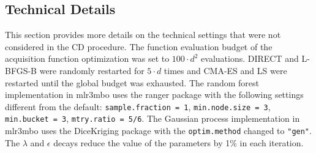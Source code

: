 \subsection*{Technical Details}
\label{sec:technical-details}

This section provides more details on the technical settings that were not considered in the CD procedure.
The function evaluation budget of the acquisition function optimization was set to $100 \cdot d^2$ evaluations.
DIRECT and L-BFGS-B were randomly restarted for $5 \cdot d$ times and CMA-ES and LS were restarted until the global budget was exhausted.
The random forest implementation in mlr3mbo uses the ranger package\cite{wright2017} with the following settings different from the default: \texttt{sample.fraction = 1}, \texttt{min.node.size = 3}, \texttt{min.bucket = 3}, \texttt{mtry.ratio = 5/6}.
The Gaussian process implementation in mlr3mbo uses the DiceKriging package\cite{roustant2012} with the \texttt{optim.method} changed to \texttt{"gen"}.
The $\lambda$ and $\epsilon$ decays reduce the value of the parameters by 1\% in each iteration.


